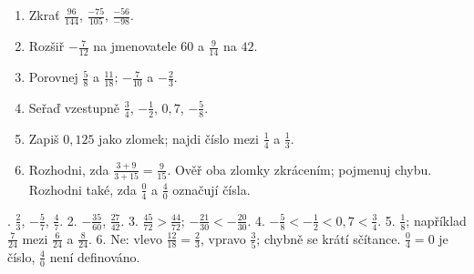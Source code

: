 \documentclass[11pt,a4paper]{article}
\begin{document}

\begin{zadaniReseniBox}[title={Domácí úkol},breakable=false]
\begin{enumerate}[label=\arabic*)]
\item Zkrať $\frac{96}{144}$, $\frac{-75}{105}$, $\frac{-56}{-98}$.
\item Rozšiř $-\frac7{12}$ na jmenovatele $60$ a $\frac9{14}$ na $42$.
\item Porovnej $\frac58$ a $\frac{11}{18}$; $-\frac7{10}$ a $-\frac23$.
\item Seřaď vzestupně $\frac34$, $-\frac12$, $0{,}7$, $-\frac58$.
\item Zapiš $0{,}125$ jako zlomek; najdi číslo mezi $\frac14$ a $\frac13$.
\item Rozhodni, zda $\frac{3+9}{3+15}=\frac9{15}$. Ověř oba zlomky
zkrácením; pojmenuj chybu. Rozhodni také, zda $\frac04$ a $\frac40$ označují čísla.
\end{enumerate}
. $\frac23$, $-\frac57$, $\frac47$.
2. $-\frac{35}{60}$, $\frac{27}{42}$.
3. $\frac{45}{72}>\frac{44}{72}$; $-\frac{21}{30}<-\frac{20}{30}$.
4. $-\frac58<-\frac12<0{,}7<\frac34$.
5. $\frac18$; například $\frac7{24}$ mezi $\frac6{24}$ a $\frac8{24}$.
6. Ne: vlevo $\frac{12}{18}=\frac23$, vpravo $\frac35$; chybně se krátí
sčítance. $\frac04=0$ je číslo, $\frac40$ není definováno.
\end{zadaniReseniBox}
\end{document}
